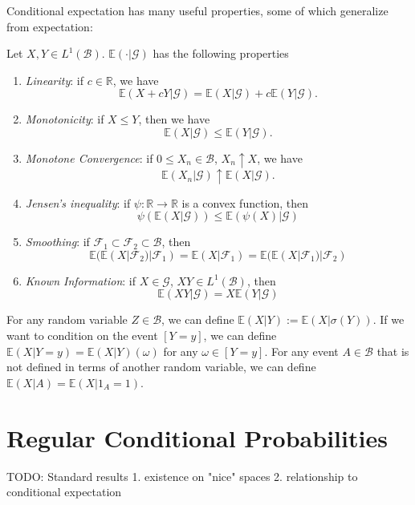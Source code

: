 Conditional expectation has many useful properties, some of which generalize from expectation:
\begin{proposition}
    \label{cexpe_properties}
    Let \(X, Y \in L^{1}(\mathcal{B})\). \(\mathbb{E}(\cdot|{\mathcal{G}})\) has the following properties
    \begin{enumerate}
        \item \textit{Linearity}: if \(c \in \mathbb{R}\), we have \[\mathbb{E}(X + cY|{\mathcal{G}}) = \mathbb{E}(X|{\mathcal{G}}) + c\mathbb{E}(Y|{\mathcal{G}}).\]
        \item \textit{Monotonicity}: if \(X \leq Y\), then we have \[\mathbb{E}(X|{\mathcal{G}}) \leq \mathbb{E}(Y|{\mathcal{G}}).\]
        \item \textit{Monotone Convergence}: if \(0 \leq X_{n} \in \mathcal{B}\), \(X_{n} \uparrow X\), we have \[\mathbb{E}(X_{n}|{\mathcal{G}}) \uparrow \mathbb{E}(X|{\mathcal{G}}).\]
        \item \textit{Jensen's inequality}: if \(\psi: \mathbb{R} \to \mathbb{R}\) is a convex function, then \[\psi(\mathbb{E}(X|{\mathcal{G}})) \leq \mathbb{E}(\psi(X)|{\mathcal{G}})\]
        \item \textit{Smoothing}: if \(\mathcal{F}_{1} \subset \mathcal{F}_{2} \subset \mathcal{B}\), then \[\mathbb{E}(\mathbb{E}(X|{\mathcal{F}_{2}})|\mathcal{F}_{1}) = \mathbb{E}(X|{\mathcal{F}_{1}}) = \mathbb{E}(\mathbb{E}(X|{\mathcal{F}_{1}})|\mathcal{F}_{2})\]
        \item \textit{Known Information}: if \(X \in \mathcal{G}\), \(XY \in L^{1}(\mathcal{B})\), then \[\mathbb{E}(XY|{\mathcal{G}}) = X\mathbb{E}(Y|{\mathcal{G}})\]
    \end{enumerate}
\end{proposition}

For any random variable \(Z \in \mathcal{B}\), we can define \(\mathbb{E}(X|Y) := \mathbb{E}(X|\sigma(Y))\). If we want to condition on the event \([Y=y]\), we can define \(\mathbb{E}(X|Y=y) = \mathbb{E}(X|Y)(\omega)\) for any \(\omega \in [Y=y]\). For any event \(A \in \mathcal{B}\) that is not defined in terms of another random variable, we can define \(\mathbb{E}(X|A) = \mathbb{E}(X|1_{A} = 1)\).

\section{Regular Conditional Probabilities}

TODO: Standard results
1. existence on "nice" spaces
2. relationship to conditional expectation